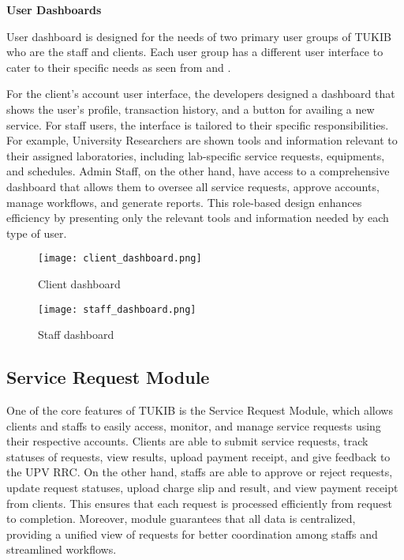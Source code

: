 \noindent \textbf{User Dashboards}

User dashboard is designed for the needs of two primary user groups of TUKIB who are the staff and clients. Each user group has a different user interface to cater to their specific needs as seen from  and .

For the client’s account user interface, the developers designed a dashboard that shows the user’s profile, transaction history, and a button for availing a new service. For staff users, the interface is tailored to their specific responsibilities. For example, University Researchers are shown tools and information relevant to their assigned laboratories, including lab-specific service requests, equipments, and schedules. Admin Staff, on the other hand, have access to a comprehensive dashboard that allows them to oversee all service requests, approve accounts, manage workflows, and generate reports. This role-based design enhances efficiency by presenting only the relevant tools and information needed by each type of user.

\begin{figure}[h]
	\centering 
	\texttt{[image: client\_dashboard.png]}
	\caption{Client dashboard}
	\label{fig:client_dashboard}
\end{figure}

\newpage

\begin{figure}[h]
	\centering 
	\texttt{[image: staff\_dashboard.png]}
	\caption{Staff dashboard}
	\label{fig:staff_dashboard}
\end{figure}

\subsection{Service Request Module}

One of the core features of TUKIB is the Service Request Module, which allows clients and staffs to easily access, monitor, and manage service requests using their respective accounts. Clients are able to submit service requests, track statuses of requests, view results, upload payment receipt, and give feedback to the UPV RRC. On the other hand, staffs are able to approve or reject requests, update request statuses, upload charge slip and result, and view payment receipt from clients. This ensures that each request is processed efficiently from request to completion. Moreover, module guarantees that all data is centralized, providing a unified view of requests for better coordination among staffs and streamlined workflows. 

